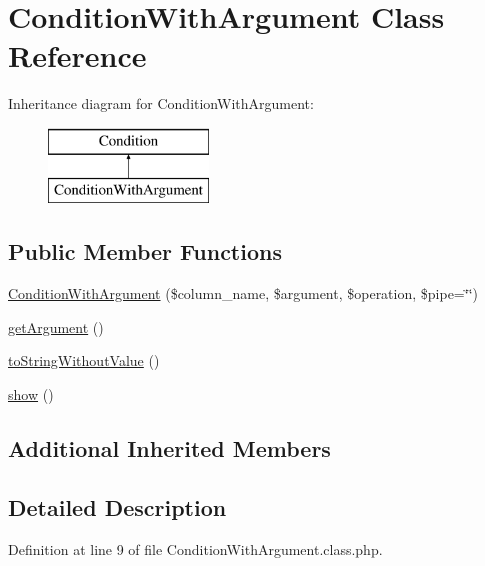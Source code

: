 \hypertarget{classConditionWithArgument}{\section{Condition\+With\+Argument Class Reference}
\label{classConditionWithArgument}
}
Inheritance diagram for Condition\+With\+Argument\+:\begin{figure}[H]
\begin{center}
\leavevmode
\includegraphics[height=2.000000cm]{classConditionWithArgument}
\end{center}
\end{figure}
\subsection*{Public Member Functions}
\begin{DoxyCompactItemize}
\item 
\hyperlink{classConditionWithArgument_a2e5d396e44a1082e6a88ac52e8c5e63d}{Condition\+With\+Argument} (\$column\+\_\+name, \$argument, \$operation, \$pipe=\char`\"{}\char`\"{})
\item 
\hyperlink{classConditionWithArgument_a58a782b4a1f7eb6fd802f8b49750aeb7}{get\+Argument} ()
\item 
\hyperlink{classConditionWithArgument_adf2841f219b6bf3b96414c2c6100ce6c}{to\+String\+Without\+Value} ()
\item 
\hyperlink{classConditionWithArgument_a1624017983d96c85a7fc0b2a986b6e25}{show} ()
\end{DoxyCompactItemize}
\subsection*{Additional Inherited Members}


\subsection{Detailed Description}


Definition at line 9 of file Condition\+With\+Argument.\+class.\+php.



